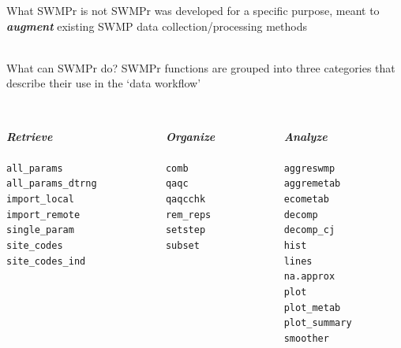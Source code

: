 \documentclass[serif]{beamer}\usepackage[]{graphicx}\usepackage[]{color}
\newcommand{\Bigtxt}[1]{\textbf{\textit{#1}}}
\begin{document}
\begin{frame}{What SWMPr is not}
SWMPr was developed for a specific purpose, meant to \Bigtxt{augment} existing SWMP data collection/processing methods \\~\\
\end{frame}

\begin{frame}[t]{What can SWMPr do?}
SWMPr functions are grouped into three categories that describe their use in the `data workflow' \\~\\
\begin{columns}[t]
\begin{column}{0.3\textwidth}
\Bigtxt{Retrieve}\\~\\
\small{
\texttt{all\_params}\\
\texttt{all\_params_dtrng}\\
\texttt{import\_local}\\
\texttt{import\_remote}\\
\texttt{single\_param}\\
\texttt{site\_codes}\\
\texttt{site\_codes\_ind}
}
\end{column}
\begin{column}{0.3\textwidth}
\Bigtxt{Organize}\\~\\
\small{
\texttt{comb}\\
\texttt{qaqc}\\
\texttt{qaqcchk}\\
\texttt{rem\_reps}\\
\texttt{setstep}\\
\texttt{subset}\\
}
\end{column}
\begin{column}{0.3\textwidth}
\Bigtxt{Analyze}\\~\\
\small{
\texttt{aggreswmp}\\
\texttt{aggremetab}\\
\texttt{ecometab}\\
\texttt{decomp}\\
\texttt{decomp\_cj}\\
\texttt{hist}\\
\texttt{lines}\\
\texttt{na.approx}\\
\texttt{plot}\\
\texttt{plot\_metab}\\
\texttt{plot\_summary}\\
\texttt{smoother}\\
}
\end{column}
\end{columns}
\end{frame}
\end{document}
